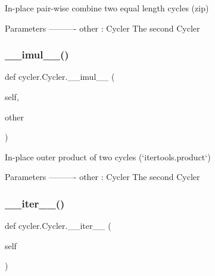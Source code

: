 \begin{DoxyVerb}In-place pair-wise combine two equal length cycles (zip)

Parameters
----------
other : Cycler
   The second Cycler
\end{DoxyVerb}
 \mbox{\label{classcycler_1_1Cycler_a0cef7faf0cf5b362c426776ebca2fe3b}} 
\subsubsection{\texorpdfstring{\+\_\+\+\_\+imul\+\_\+\+\_\+()}{\_\_imul\_\_()}}
{\footnotesize\ttfamily def cycler.\+Cycler.\+\_\+\+\_\+imul\+\_\+\+\_\+ (\begin{DoxyParamCaption}\item[{}]{self,  }\item[{}]{other }\end{DoxyParamCaption})}

\begin{DoxyVerb}In-place outer product of two cycles (`itertools.product`)

Parameters
----------
other : Cycler
   The second Cycler
\end{DoxyVerb}
 \mbox{\label{classcycler_1_1Cycler_a9791a4e7220bef0833025e5ad3eae57d}} 
\subsubsection{\texorpdfstring{\+\_\+\+\_\+iter\+\_\+\+\_\+()}{\_\_iter\_\_()}}
{\footnotesize\ttfamily def cycler.\+Cycler.\+\_\+\+\_\+iter\+\_\+\+\_\+ (\begin{DoxyParamCaption}\item[{}]{self }\end{DoxyParamCaption})}

\mbox{\label{classcycler_1_1Cycler_a843d7e667e9d243e9a73e7c925e1cd2f}} 
